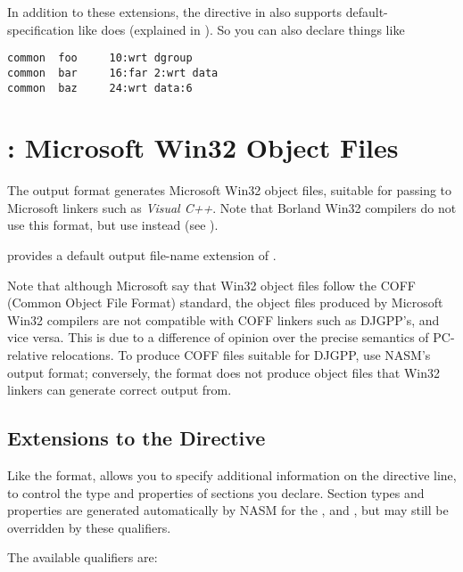 In addition to these extensions, the  directive
in  also supports default- specification
like  does (explained in ).
So you can also declare things like

\begin{lstlisting}
common  foo     10:wrt dgroup
common  bar     16:far 2:wrt data
common  baz     24:wrt data:6
\end{lstlisting}

\section{: Microsoft Win32 Object Files}
\label{sec:win32fmt}

The  output format generates Microsoft Win32 object files,
suitable for passing to Microsoft linkers such as \emph{Visual C++}.
Note that Borland Win32 compilers do not use this format, but use
 instead (see ).

 provides a default output file-name extension of .

Note that although Microsoft say that Win32 object files follow the
COFF (Common Object File Format) standard, the object files produced
by Microsoft Win32 compilers are not compatible with COFF linkers such
as DJGPP's, and vice versa. This is due to a difference of opinion over
the precise semantics of PC-relative relocations. To produce COFF files
suitable for DJGPP, use NASM's  output format; conversely,
the  format does not produce object files that Win32 linkers
can generate correct output from.

\subsection{ Extensions to the  Directive}
\label{subsec:win32sect}

Like the  format,  allows you to specify additional
information on the  directive line, to control the type
and properties of sections you declare. Section types and properties
are generated automatically by NASM for the 
,  and , but may still be overridden by
these qualifiers.

The available qualifiers are:


